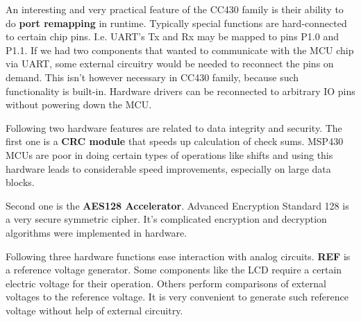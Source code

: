 An interesting and very practical feature of the CC430 family is
their ability to do {\bf port remapping} in runtime. Typically special
functions are hard-connected to certain chip pins. I.e. UART's Tx and
Rx may be mapped to pins P1.0 and P1.1. If we had two components that
wanted to communicate with the MCU chip via UART, some external
circuitry would be needed to reconnect the pins on demand. This isn't
however necessary in CC430 family, because such functionality is
built-in. Hardware drivers can be reconnected to arbitrary IO pins
without powering down the MCU.

Following two hardware features are related to data integrity and
security. The first one is a {\bf CRC module} that speeds up
calculation of check sums.  MSP430 MCUs are poor in doing certain
types of operations like shifts and using this hardware leads to
considerable speed improvements, especially on large data blocks.

Second one is the {\bf AES128 Accelerator}. Advanced Encryption
Standard 128 is a very secure symmetric cipher. It's complicated
encryption and decryption algorithms were implemented in hardware.

Following three hardware functions ease interaction with analog
circuits.  {\bf REF} is a reference voltage generator. Some components
like the LCD require a certain electric voltage for their operation.
Others perform comparisons of external voltages to the reference
voltage. It is very convenient to generate such reference voltage
without help of external circuitry.

